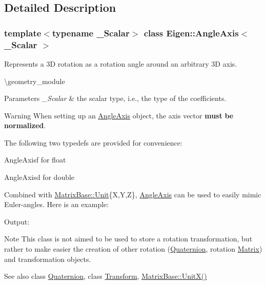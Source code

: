 \subsection{Detailed Description}
\subsubsection*{template$<$typename \+\_\+\+Scalar$>$\newline
class Eigen\+::\+Angle\+Axis$<$ \+\_\+\+Scalar $>$}

Represents a 3D rotation as a rotation angle around an arbitrary 3D axis. 

\textbackslash{}geometry\+\_\+module


\begin{DoxyParams}{Parameters}
{\em \+\_\+\+Scalar} & the scalar type, i.\+e., the type of the coefficients.\\
\hline
\end{DoxyParams}
\begin{DoxyWarning}{Warning}
When setting up an \mbox{\hyperlink{class_eigen_1_1_angle_axis}{Angle\+Axis}} object, the axis vector {\bfseries{must}} {\bfseries{be}} {\bfseries{normalized}}.
\end{DoxyWarning}
The following two typedefs are provided for convenience\+: \begin{DoxyItemize}
\item {\ttfamily Angle\+Axisf} for {\ttfamily float} \item {\ttfamily Angle\+Axisd} for {\ttfamily double} \end{DoxyItemize}
Combined with \mbox{\hyperlink{class_eigen_1_1_matrix_base_a1f39dde25807c1f008aa874e690b3fed}{Matrix\+Base\+::\+Unit}}\{X,Y,Z\}, \mbox{\hyperlink{class_eigen_1_1_angle_axis}{Angle\+Axis}} can be used to easily mimic Euler-\/angles. Here is an example\+: 
\begin{DoxyCodeInclude}{0}
\end{DoxyCodeInclude}
 Output\+: 
\begin{DoxyVerbInclude}
\end{DoxyVerbInclude}


\begin{DoxyNote}{Note}
This class is not aimed to be used to store a rotation transformation, but rather to make easier the creation of other rotation (\mbox{\hyperlink{class_eigen_1_1_quaternion}{Quaternion}}, rotation \mbox{\hyperlink{class_eigen_1_1_matrix}{Matrix}}) and transformation objects.
\end{DoxyNote}
\begin{DoxySeeAlso}{See also}
class \mbox{\hyperlink{class_eigen_1_1_quaternion}{Quaternion}}, class \mbox{\hyperlink{class_eigen_1_1_transform}{Transform}}, \mbox{\hyperlink{class_eigen_1_1_matrix_base_ac12aa899494685551e11f238836ee600}{Matrix\+Base\+::\+Unit\+X()}} 
\end{DoxySeeAlso}


